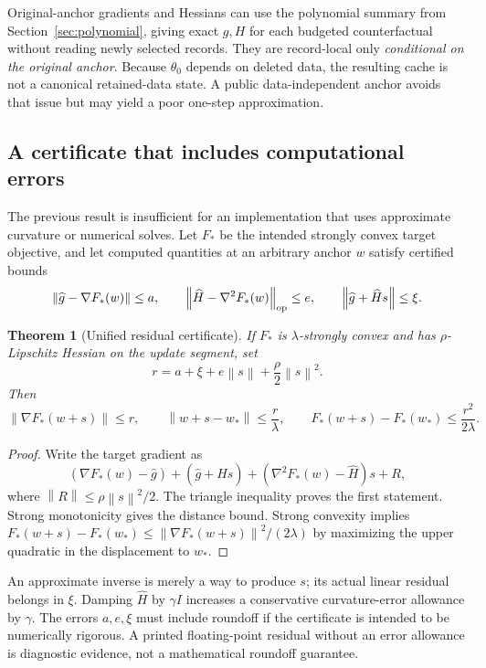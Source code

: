 \documentclass[11pt,a4paper]{article}
\newtheorem{theorem}{Theorem}[section]
\theoremstyle{definition}\newtheorem{definition}[theorem]{Definition}
\newcommand{\norm}[1]{\left\lVert #1\right\rVert}
\begin{document}
Original-anchor gradients and Hessians can use the polynomial summary from Section~\ref{sec:polynomial}, giving exact $g,H$ for each budgeted counterfactual without reading newly selected records. They are record-local only \emph{conditional on the original anchor}. Because $\theta_0$ depends on deleted data, the resulting cache is not a canonical retained-data state. A public data-independent anchor avoids that issue but may yield a poor one-step approximation.

\subsection{A certificate that includes computational errors}
The previous result is insufficient for an implementation that uses approximate curvature or numerical solves. Let $F_*$ be the intended strongly convex target objective, and let computed quantities at an arbitrary anchor $w$ satisfy certified bounds
\[
 \norm{\widehat g-\nabla F_*(w)}\le a,\qquad
 \norm{\widehat H-\nabla^2F_*(w)}_{\rm op}\le e,\qquad
 \norm{\widehat g+\widehat Hs}\le\xi.
\]
\begin{theorem}[Unified residual certificate]\label{thm:residual}
If $F_*$ is $\lambda$-strongly convex and has $\rho$-Lipschitz Hessian on the update segment, set
\begin{equation}\label{eq:residual}
 r=a+\xi+e\norm{s}+\frac\rho2\norm{s}^2.
\end{equation}
Then
\[
 \norm{\nabla F_*(w+s)}\le r,\qquad
 \norm{w+s-w_*}\le\frac r\lambda,\qquad
 F_*(w+s)-F_*(w_*)\le\frac{r^2}{2\lambda}.
\]
\end{theorem}
\begin{proof}
Write the target gradient as
\[
 (\nabla F_*(w)-\widehat g)+(\widehat g+\widehat Hs)
 +(\nabla^2F_*(w)-\widehat H)s+R,
\]
where $\norm R\le\rho\norm{s}^2/2$. The triangle inequality proves the first statement. Strong monotonicity gives the distance bound. Strong convexity implies
$F_*(w+s)-F_*(w_*)\le\norm{\nabla F_*(w+s)}^2/(2\lambda)$ by maximizing the upper quadratic in the displacement to $w_*$.
\end{proof}
An approximate inverse is merely a way to produce $s$; its actual linear residual belongs in $\xi$. Damping $\widehat H$ by $\gamma I$ increases a conservative curvature-error allowance by $\gamma$. The errors $a,e,\xi$ must include roundoff if the certificate is intended to be numerically rigorous. A printed floating-point residual without an error allowance is diagnostic evidence, not a mathematical roundoff guarantee.
\end{document}
